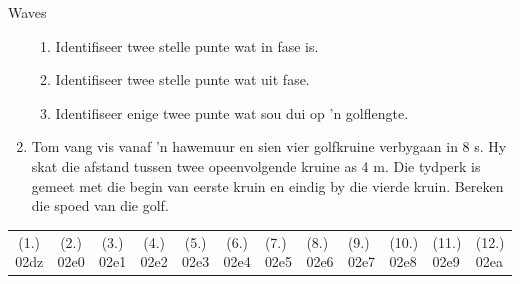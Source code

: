 \begin{exercises}{Waves}
\begin{enumerate}[noitemsep, label=\textbf{\arabic*}. ]
\begin{figure}[H]
 \end{figure}       \label{m38806*id321157}\begin{enumerate}[noitemsep, label=\textbf{\alph*}. ] 
            \label{m38806*uid55}\item Identifiseer twee stelle punte wat in fase is.
\label{m38806*uid56}\item Identifiseer twee stelle punte wat uit fase.
\label{m38806*uid57}\item Identifiseer enige twee punte wat sou dui op 'n golflengte.
\end{enumerate}
                \label{m38806*uid58}\item Tom vang vis vanaf  'n hawemuur en sien vier golfkruine verbygaan in 8 s. Hy  skat die 
            afstand tussen twee opeenvolgende kruine as 4 m. Die tydperk is gemeet met die begin
            van eerste kruin en eindig by die vierde kruin. Bereken die spoed van die golf.
\end{enumerate}
\practiceinfo
 \par \begin{tabular}[h]{cccccc}
 (1.) 02dz  &  (2.) 02e0  &  (3.) 02e1  &  (4.) 02e2  &  (5.) 02e3  &  (6.) 02e4  &  (7.) 02e5  &  (8.) 02e6  &  (9.) 02e7  &  (10.) 02e8  &  (11.) 02e9  &  (12.) 02ea  & \end{tabular}

\end{exercises}    

